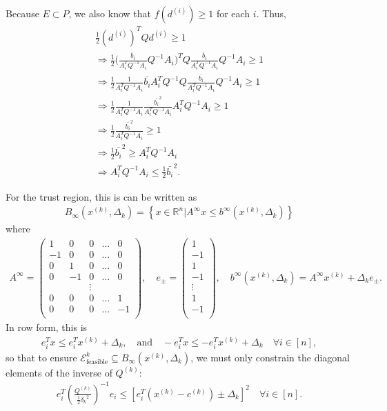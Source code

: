 \documentclass{article}
\theoremstyle{case}
\numberwithin{theorem}{subsection}
\newcommand{\atr}{A^{\infty}}
\newcommand{\btr}{b^{\infty}}
\newcommand{\ck}{{c^{(k)}}}
\newcommand{\dk}{\Delta_k}
\newcommand{\qk}{{Q^{(k)}}}
\newcommand{\Rn}{\mathbb R^n}
\newcommand{\sdk}{{\delta_k}}
\newcommand{\tr}{{ B_{\infty}\left(\xk, \dk\right) }}
\newcommand{\unshiftedellipsoid}{{\mathcal E^k_{\textrm{feasible}}}}
\newcommand{\xk}{x^{(k)}}
\begin{document}
Because $E \subset P$, we also know that $f(d^{(i)}) \ge 1$ for each $i$. Thus,
\begin{align*}
\frac 1 2 (d^{(i)})^{T} Q d^{(i)} \ge 1 \\
\Longrightarrow \frac 1 2 \bigg(\frac {\bar{b}_i}{A_i^T  Q^{-1}A_i}  Q^{-1}A_i\bigg)^{T} Q \frac {\bar{b}_i}{A_i^T  Q^{-1}A_i}  Q^{-1}A_i \ge 1 \\
\Longrightarrow \frac 1 2 \frac {1}{A_i^T  Q^{-1}A_i}  \bar{b_i} A_i^T Q^{-1} Q \frac {\bar{b_i}}{A_i^T  Q^{-1}A_i}  Q^{-1}A_i \ge 1 \\
\Longrightarrow \frac 1 2 \frac {1}{A_i^T  Q^{-1}A_i}  \frac {\bar{b_i}^2}{A_i^T  Q^{-1}A_i}  A_i^T Q^{-1}A_i \ge 1 \\
\Longrightarrow \frac 1 2  \frac {\bar{b_i}^2}{A_i^T  Q^{-1}A_i} \ge 1 \\
\Longrightarrow \frac 1 2 \bar{b_i}^2\ge A_i^T  Q^{-1}A_i \\
\Longrightarrow A_i^T  Q^{-1}A_i \le \frac 1 2 \bar{b_i}^2.
\end{align*}

For the trust region, this is can be written as
\begin{align*}
\tr = \left\{ x \in \Rn | \atr x\le \btr\left(\xk, \dk\right) \right\}
\end{align*}
where
\begin{align}
\atr = \begin{pmatrix}
 1 &  0 & 0      & \ldots &  0 \\
-1 &  0 & 0      & \ldots &  0 \\
 0 &  1 & 0      & \ldots &  0 \\
 0 & -1 & 0      & \ldots &  0 \\
   &    & \vdots &        &    \\
 0 &  0 &      0 & \ldots &  1 \\
 0 &  0 &      0 & \ldots & -1 \\
\end{pmatrix}, \quad
e_{\pm} = \begin{pmatrix}
1 \\
-1 \\
1 \\
-1 \\
\vdots \\
1 \\
-1 \\
\end{pmatrix}, \quad
\btr\left(\xk, \dk\right) = \atr \xk + \dk e_{\pm}. \label{define_atr}
\end{align}
In row form, this is
\begin{align*}
e_i ^T x \le e_i^T\xk + \dk, \quad \textrm{and} \quad
-e_i ^T x \le -e_i^T\xk + \dk \quad \forall i \in [n],
\end{align*}
so that to ensure $\unshiftedellipsoid \subseteq \tr$, we must only constrain the diagonal elements of the inverse of $\qk$:
\begin{align}
e_i^T\left(\frac{\qk}{\frac 1 2 \sdk^2}\right)^{-1} e_i \le \left[e_i^T\left(\xk - \ck\right) \pm \dk \right]^2 \quad \forall i \in [n].
\label{ellipsoids_trust_region_constraints}
\end{align}
\end{document}
